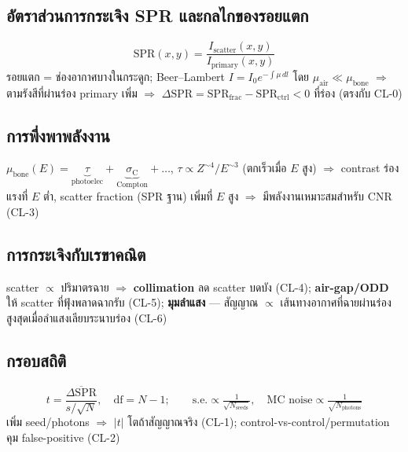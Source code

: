 \documentclass[14pt]{extarticle}
\begin{document}
\subsection{อัตราส่วนการกระเจิง SPR และกลไกของรอยแตก}
\[ \mathrm{SPR}(x,y)=\frac{I_{\text{scatter}}(x,y)}{I_{\text{primary}}(x,y)} \]
รอยแตก = ช่องอากาศบางในกระดูก; Beer--Lambert $I=I_0 e^{-\int \mu\,dl}$ โดย
$\mu_{\text{air}}\!\ll\!\mu_{\text{bone}}$ $\Rightarrow$ ตามรังสีที่ผ่านร่อง primary เพิ่ม $\Rightarrow$
$\Delta\mathrm{SPR}=\mathrm{SPR}_{\text{frac}}-\mathrm{SPR}_{\text{ctrl}}<0$ ที่ร่อง (ตรงกับ CL-0)

\subsection{การพึ่งพาพลังงาน}
$\mu_{\text{bone}}(E)=\underbrace{\tau}_{\text{photoelec}}+\underbrace{\sigma_{\text{C}}}_{\text{Compton}}+\dots$,
$\tau\propto Z^{\sim4}/E^{\sim3}$ (ตกเร็วเมื่อ $E$ สูง) $\Rightarrow$ contrast ร่องแรงที่ $E$ ต่ำ,
scatter fraction (SPR ฐาน) เพิ่มที่ $E$ สูง $\Rightarrow$ มีพลังงานเหมาะสมสำหรับ CNR (CL-3)

\subsection{การกระเจิงกับเรขาคณิต}
scatter $\propto$ ปริมาตรฉาย $\Rightarrow$ \textbf{collimation} ลด scatter บดบัง (CL-4);
\textbf{air-gap/ODD} ให้ scatter ที่ฟุ้งพลาดฉากรับ (CL-5);
\textbf{มุมลำแสง} --- สัญญาณ $\propto$ เส้นทางอากาศที่ฉายผ่านร่อง สูงสุดเมื่อลำแสงเลียบระนาบร่อง (CL-6)

\subsection{กรอบสถิติ}
\[ t=\frac{\overline{\Delta\mathrm{SPR}}}{s/\sqrt{N}},\quad \mathrm{df}=N-1;\qquad
   \text{s.e.}\propto\tfrac{1}{\sqrt{N_{\text{seeds}}}},\quad
   \text{MC noise}\propto\tfrac{1}{\sqrt{N_{\text{photons}}}} \]
เพิ่ม seed/photons $\Rightarrow$ $|t|$ โตถ้าสัญญาณจริง (CL-1); control-vs-control/permutation คุม false-positive (CL-2)

\end{document}
